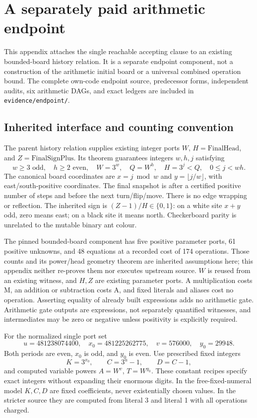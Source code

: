 \documentclass[11pt,letterpaper]{article}
\theoremstyle{definition}\newtheorem{definition}[theorem]{Definition}
\theoremstyle{remark}\newtheorem{remark}[theorem]{Remark}
\newcommand{\codeu}[1]{\nolinkurl{#1}}
\begin{document}
\section{A separately paid arithmetic endpoint}\label{ptr:la:app:endpoint}
This appendix attaches the single reachable accepting clause to an existing bounded-board history relation. It is a separate endpoint component, not a construction of the arithmetic initial board or a universal combined operation bound. The complete own-code endpoint source, predecessor forms, independent audits, six arithmetic DAGs, and exact ledgers are included in \codeu{evidence/endpoint/}.

\subsection{Inherited interface and counting convention}
The parent history relation supplies existing integer ports $W$, $H=\mathrm{FinalHead}$, and $Z=\mathrm{FinalSignPlus}$. Its theorem guarantees integers $w,h,j$ satisfying
\[
 w\ge3\text{ odd},\quad h\ge2\text{ even},\quad
 W=3^w,\quad Q=W^h,\quad H=3^j<Q,\quad0\le j<wh.
\]
The canonical board coordinates are $x=j\bmod w$ and $y=\lfloor j/w\rfloor$, with east/south-positive coordinates. The final snapshot is after a certified positive number of steps and before the next turn/flip/move. There is no edge wrapping or reflection. The inherited sign is $(Z-1)/H\in\{0,1\}$: on a white site $x+y$ odd, zero means east; on a black site it means north. Checkerboard parity is unrelated to the mutable binary ant colour.

The pinned bounded-board component has five positive parameter ports, 61 positive unknowns, and 48 equations at a recorded cost of 174 operations. Those counts and its power/head geometry theorem are inherited assumptions here; this appendix neither re-proves them nor executes upstream source. $W$ is reused from an existing witness, and $H,Z$ are existing parameter ports. A multiplication costs M, an addition or subtraction costs A, and fixed literals and aliases cost no operation. Asserting equality of already built expressions adds no arithmetic gate. Arithmetic gate outputs are expressions, not separately quantified witnesses, and intermediates may be zero or negative unless positivity is explicitly required.

For the normalized single port set
\[
 u=481238074400,\quad x_0=481225262775,\quad
 v=576000,\quad y_0=29948.
\]
Both periods are even, $x_0$ is odd, and $y_0$ is even. Use prescribed fixed integers
\[
 K=3^{x_0},\qquad C=3^u-1,\qquad D=C-1,
\]
and computed variable powers $A=W^v$, $T=W^{y_0}$. These constant recipes specify exact integers without expanding their enormous digits. In the free-fixed-numeral model $K,C,D$ are fixed coefficients, never existentially chosen values. In the stricter source they are computed from literal 3 and literal 1 with all operations charged.
\end{document}
